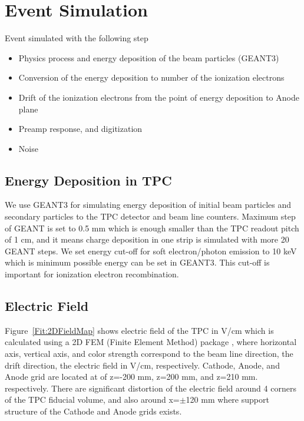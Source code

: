\section{Event Simulation}
Event simulated with the following step
\begin{itemize}
\item Physics process and energy deposition of the beam particles (GEANT3)
\item Conversion of the energy deposition to number of the ionization electrons
\item Drift of the ionization electrons from the point of energy deposition to Anode plane
\item Preamp response, and digitization
\item Noise
\end{itemize}

\subsection{Energy Deposition in TPC}

We use GEANT3 for simulating energy deposition of initial beam particles and
secondary particles to the TPC detector and beam line counters. 
Maximum step of GEANT is set to 0.5 mm which is enough smaller than the TPC readout pitch of 1 cm,
and it means charge deposition in one strip is simulated with more 20 GEANT steps.
We set energy cut-off for soft electron/photon emission to
10 keV which is minimum possible energy can be set in GEANT3.
This cut-off is important for ionization electron recombination.

\subsection{Electric Field}

Figure~\ref{Fit:2DFieldMap} shows electric field of the TPC in V/cm which is calculated using a 2D FEM 
(Finite Element Method) package \cite{Ref:FEMTET},
where horizontal axis, vertical axis, and color strength 
correspond to the beam line direction, the drift direction, the electric field in V/cm, respectively.
Cathode, Anode, and Anode grid are located at of z=-200 mm, z=200 mm, and z=210 mm. respectively.
There are significant distortion of the electric field around 4 corners of the TPC fiducial volume,
and also around x=$\pm$120 mm where support structure of the Cathode and Anode grids exists.

